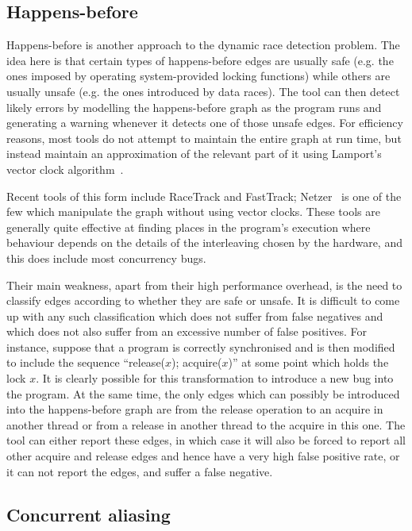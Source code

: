 \subsection{Happens-before}

Happens-before is another approach to the dynamic race detection
problem.  The idea here is that certain types of happens-before edges
are usually safe (e.g. the ones imposed by operating system-provided
locking functions) while others are usually unsafe (e.g. the ones
introduced by data races).  The tool can then detect likely errors by
modelling the happens-before graph as the program runs and generating
a warning whenever it detects one of those unsafe edges.  For
efficiency reasons, most tools do not attempt to maintain the entire
graph at run time, but instead maintain an approximation of the
relevant part of it using Lamport's vector clock
algorithm~\cite{Lamport1978}.

Recent tools of this form include RaceTrack\cite{Yu2005} and
FastTrack\cite{Flanagan2009}; Netzer~\cite{Netzer1991} is one of the
few which manipulate the graph without using vector clocks.  These
tools are generally quite effective at finding places in the program's
execution where behaviour depends on the details of the interleaving
chosen by the hardware, and this does include most concurrency bugs.

Their main weakness, apart from their high performance overhead, is
the need to classify edges according to whether they are safe or
unsafe.  It is difficult to come up with any such classification which
does not suffer from false negatives and which does not also suffer
from an excessive number of false positives.  For instance, suppose
that a program is correctly synchronised and is then modified to
include the sequence ``release($x$); acquire($x$)'' at some point
which holds the lock $x$.  It is clearly possible for this
transformation to introduce a new bug into the program.  At the same
time, the only edges which can possibly be introduced into the
happens-before graph are from the release operation to an acquire in
another thread or from a release in another thread to the acquire in
this one.  The tool can either report these edges, in which case it
will also be forced to report all other acquire and release edges and
hence have a very high false positive rate, or it can not report the
edges, and suffer a false negative.

\subsection{Concurrent aliasing}

